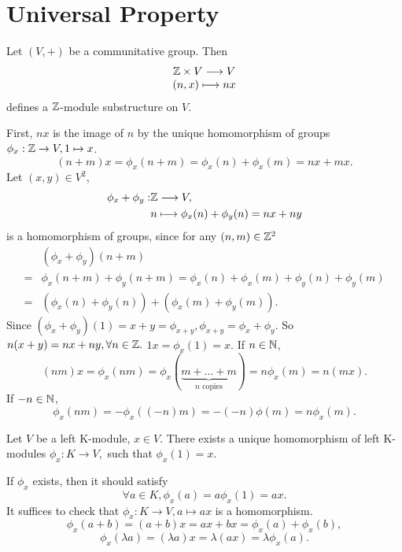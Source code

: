 \documentclass{book}
\numberwithin{equation}{section}
\begin{document}
\section{Universal Property}
\begin{propositionenv}
    Let $(V, +)$ be a communitative group. Then 
    $$\begin{matrix}
        \mathbb{Z}\times V\longrightarrow V\\
        (n, x)\longmapsto nx
    \end{matrix}$$
    defines a $\mathbb{Z}$-module substructure on $V$.
\end{propositionenv}
\begin{proofenv}
    First,  $nx$ is the image of $n$ by the unique homomorphism of groups $\phi_x:\mathbb{Z}\rightarrow V, 1\mapsto x$.
    $$(n+m)x=\phi_x(n+m)=\phi_x(n)+\phi_x(m)=nx+mx.$$
     Let $(x, y)\in V^2$, 
    \begin{align*}
        \phi_x+\phi_y:&\mathbb{Z} \longrightarrow V, \\
        &n\longmapsto \phi_x(n)+\phi_y(n)=nx+ny
    \end{align*}
    is a homomorphism of groups,  since for any $(n, m)\in \mathbb{Z}^2$
    \begin{align*}
        &(\phi_x+\phi_y)(n+m)\\
        =&\phi_x(n+m)+\phi_y(n+m)=\phi_x(n)+\phi_x(m)+\phi_y(n)+\phi_y(m)\\
        =&(\phi_x(n)+\phi_y(n))+(\phi_x(m)+\phi_y(m)).
    \end{align*}
    Since $(\phi_x+\phi_y)(1)=x+y=\phi_{x+y}, \phi_{x+y}=\phi_x+\phi_y.$ So $n(x+y)=nx+ny,  \forall n\in\mathbb{Z}.$ $1x=\phi_x(1)=x.$
    If $n\in \mathbb{N}$, 
    $$(nm)x=\phi_x(nm)=\phi_x(\underset{n \text{ copies}}{\underbrace{m+\dots+m}})=n\phi_x(m)=n(mx).$$
    If $-n\in \mathbb{N}$, 
    $$\phi_x(nm)=-\phi_x((-n)m)=-(-n)\phi(m)=n\phi_x(m).$$
\end{proofenv}
\begin{propositionenv}
    Let $V$ be a left K-module,  $x\in V$. There exists a unique homomorphism of left K-modules 
    $\phi_x:K\longrightarrow V, $
    such that $\phi_x(1)=x$.
\end{propositionenv}
\begin{proofenv}
    If $\phi_x$ exists,  then it should satisfy 
    $$\forall a\in K, \phi_x(a)=a\phi_x(1)=ax.$$
    It suffices to check that $\phi_x:K\rightarrow V, a\mapsto ax$ is a homomorphism.
    $$\phi_x(a+b)=(a+b)x=ax+bx=\phi_x(a)+\phi_x(b), $$
    $$\phi_x(\lambda a)=(\lambda a)x=\lambda(ax)=\lambda\phi_x(a).$$
\end{proofenv}
\end{document}
